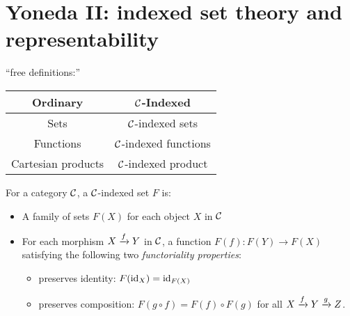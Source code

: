 

\chapter{Yoneda II: indexed set theory and representability}


``free definitions:''

\begin{center}
 \begin{tabular}{cc}
  \toprule
  \textbf{Ordinary} & \textbf{$\mathcal C$-Indexed} \\
  \midrule 
  Sets & $\mathcal C$-indexed sets \\
  Functions & $\mathcal C$-indexed functions \\
  Cartesian products & $\mathcal C$-indexed product \\
  \bottomrule
\end{tabular}
 
\end{center}

\begin{definition}
  For a category $\mathcal C$,
  a $\mathcal C$-indexed set $F$ is:
  \begin{itemize}
    \item A family of sets
  $F(X)$ for each object $X$ in $\mathcal C$
    \item For each morphism $X \xrightarrow{f} Y$ in $\mathcal C$, 
    a function $F(f) : F(Y) \to F(X)$ satisfying
    the following two \emph{functoriality properties}:
    \begin{itemize}
    \item preserves identity: $F(\operatorname{id}_X) = \operatorname{id}_{F(X)}$
    \item preserves composition: $F(g \circ f) = F(f) \circ F(g)$ for all $X \xrightarrow{f} Y \xrightarrow{g} Z$.
    \end{itemize}
  \end{itemize}
\end{definition}

